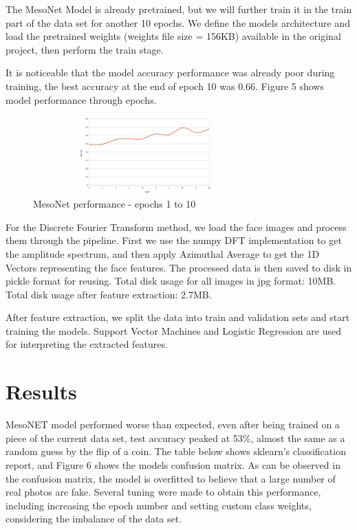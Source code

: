 \documentclass{bmvc2k}
\begin{document}
The MesoNet Model is already pretrained, but we will further train it in the train part of the data set for another 10 epochs. We define the models architecture and load the pretrained weights (weights file size = 156KB) available in the original project, then perform the train stage.

It is noticeable that the model accuracy performance was already poor during training, the best accuracy at the end of epoch 10 was 0.66. Figure 5 shows model performance through epochs.

\begin{figure}[!h]
\centering
\includegraphics[width=8.6cm, height=3.0cm]{Figs/train-performance-mesonet.png}
    \caption{MesoNet performance - epochs 1 to 10}
\end{figure}

\hspace{1.5cm}

For the Discrete Fourier Transform method, we load the face images and process them through the pipeline. First we use the numpy DFT implementation to get the amplitude spectrum, and then apply Azimuthal Average to get the 1D Vectors representing the face features. The processed data is then saved to disk in pickle format for reusing. Total disk usage for all images in jpg format: 10MB. Total disk usage after feature extraction: 2.7MB.

After feature extraction, we split the data into train and validation sets and start training the models. Support Vector Machines and Logistic Regression are used for interpreting the extracted features.

\section{Results}

MesoNET model performed worse than expected, even after being trained on a piece of the current data set, test accuracy peaked at 53\%, almost the same as a random guess by the flip of a coin. The table below shows sklearn's classification report, and Figure 6 shows the models confusion matrix. As can be observed in the confusion matrix, the model is overfitted to believe that a large number of real photos are fake. Several tuning were made to obtain this performance, including increasing the epoch number and setting custom class weights, considering the imbalance of the data set.
\end{document}
